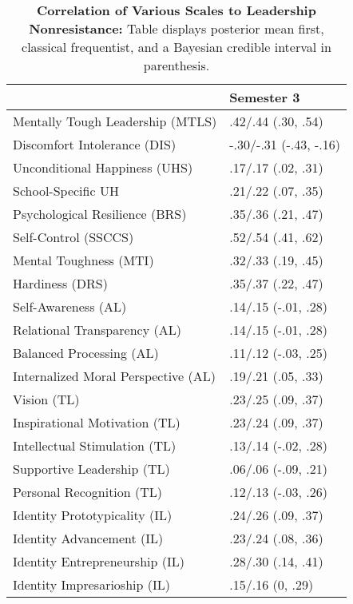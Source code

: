 \begin{table}[ht]
\centering
\begin{tabular}{ll}
  \hline
 & Semester 3 \\ 
  \hline
Mentally Tough Leadership (MTLS) & .42/.44 (.30, .54) \\ 
  Discomfort Intolerance (DIS) & -.30/-.31 (-.43, -.16) \\ 
  Unconditional Happiness (UHS) & .17/.17 (.02, .31) \\ 
  School-Specific UH & .21/.22 (.07, .35) \\ 
  Psychological Resilience (BRS) & .35/.36 (.21, .47) \\ 
  Self-Control (SSCCS) & .52/.54 (.41, .62) \\ 
  Mental Toughness (MTI) & .32/.33 (.19, .45) \\ 
  Hardiness (DRS) & .35/.37 (.22, .47) \\ 
  Self-Awareness (AL) & .14/.15 (-.01, .28) \\ 
  Relational Transparency (AL) & .14/.15 (-.01, .28) \\ 
  Balanced Processing (AL) & .11/.12 (-.03, .25) \\ 
  Internalized Moral Perspective (AL) & .19/.21 (.05, .33) \\ 
  Vision (TL) & .23/.25 (.09, .37) \\ 
  Inspirational Motivation (TL) & .23/.24 (.09, .37) \\ 
  Intellectual Stimulation (TL) & .13/.14 (-.02, .28) \\ 
  Supportive Leadership (TL) & .06/.06 (-.09, .21) \\ 
  Personal Recognition (TL) & .12/.13 (-.03, .26) \\ 
  Identity Prototypicality (IL) & .24/.26 (.09, .37) \\ 
  Identity Advancement (IL) & .23/.24 (.08, .36) \\ 
  Identity Entrepreneurship (IL) & .28/.30 (.14, .41) \\ 
  Identity Impresarioship (IL) & .15/.16 (0, .29) \\ 
   \hline
\end{tabular}
\caption{\textbf{Correlation of Various Scales to Leadership Nonresistance:} Table displays posterior mean first, classical frequentist, and a Bayesian credible interval in parenthesis.} 
\label{tab:lnr_corr}
\end{table}
